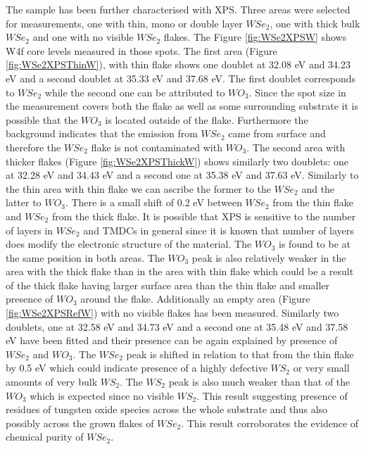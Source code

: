 The sample has been further characterised with XPS. Three areas were selected for measurements, one with thin, mono or double layer $WSe_2$, one with thick bulk $WSe_2$ and one with no visible $WSe_2$ flakes. The Figure \ref{fig:WSe2XPSW} shows W4f core levels measured in those spots. The first area (Figure \ref{fig:WSe2XPSThinW}), with thin flake shows one doublet at 32.08 eV and 34.23 eV and a second doublet at 35.33 eV and 37.68 eV. The first doublet corresponds to $WSe_2$ while the second one can be attributed to $WO_3$. Since the spot size in the measurement covers both the flake as well as some surrounding substrate it is possible that the $WO_3$ is located outside of the flake. Furthermore the background indicates that the emission from $WSe_2$ came from surface and therefore the $WSe_2$ flake is not contaminated with $WO_3$. 
The second area with thicker flakes (Figure \ref{fig:WSe2XPSThickW}) shows similarly two doublets: one at 32.28 eV and 34.43 eV and a second one at 35.38 eV and 37.63 eV. Similarly to the thin area with thin flake we can ascribe the former to the $WSe_2$ and the latter to $WO_3$. There is a small shift of 0.2 eV between $WSe_2$ from the thin flake and $WSe_2$ from the thick flake. It is possible that XPS is sensitive to the number of layers in $WSe_2$ and TMDCs in general since it is known that number of layers does modify the electronic structure of the material. The $WO_3$ is found to be at the same position in both areas. The $WO_3$ peak is also relatively weaker in the area with the thick flake than in the area with thin flake which could be a result of the thick flake having larger surface area than the thin flake and smaller presence of $WO_3$ around the flake. 
Additionally an empty area (Figure \ref{fig:WSe2XPSRefW}) with no visible flakes has been measured. Similarly two doublets, one at 32.58 eV and 34.73 eV and a second one at 35.48 eV and 37.58 eV have been fitted and their presence can be again explained by presence of $WSe_2$ and $WO_3$. The $WSe_2$ peak is shifted in relation to that from the thin flake by 0.5 eV which could indicate presence of a highly defective $WS_2$ or very small amounts of very bulk $WS_2$. The $WS_2$ peak is also much weaker than that of the $WO_3$ which is expected since no visible $WS_2$. This result suggesting presence of residues of tungsten oxide species across the whole substrate and thus also possibly across the grown flakes of $WSe_2$. This result corroborates the evidence of chemical purity of $WSe_2$.

